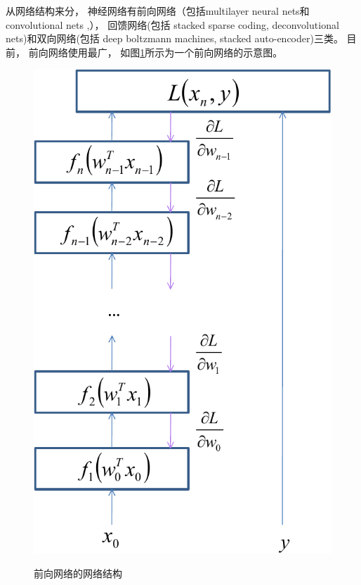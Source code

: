 从网络结构来分， 神经网络有前向网络（包括multilayer neural nets\cite{kuurkova1992kolmogorov,
hornik1989multilayer,hornik1991approximation}和 convolutional nets \cite{lecun1995convolutional,krizhevsky2012imagenet},）， 回馈网络(包括 stacked sparse coding\cite{yu2011learning}, deconvolutional nets\cite{zeiler2010deconvolutional})和双向网络(包括 deep boltzmann machines\cite{salakhutdinov2009deep,
srivastava2012multimodal,goodfellow2013multi}, stacked auto-encoder\cite{gehring2013extracting,vincent2010stacked,vincent2008extracting})三类\cite{lecun2013deep}。 目前， 前向网络使用最广， 如图\ref{fig:feed_forward}所示为一个前向网络的示意图。 

\begin{figure}[htb]
  \centering
  \includegraphics[scale=0.9]{Pictures/CNN/feed-forward-crop.pdf}\\
  \caption{前向网络的网络结构}\label{fig:feed_forward}
\end{figure}

